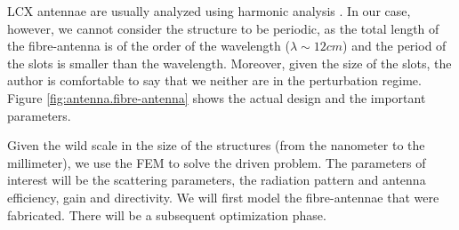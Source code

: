LCX antennae are usually analyzed using harmonic analysis \cite{WAN2001}. 
In our case, however, we cannot consider the structure to be periodic, as the total 
length of the fibre-antenna is of the order of the wavelength ($\lambda\sim12\unit{cm}$) and the period
of the slots is smaller than the wavelength. Moreover, given the size of the slots, 
the author is comfortable to say that we neither are in the perturbation regime. 
Figure \ref{fig:antenna.fibre-antenna} shows the actual design and the important parameters.

Given the wild scale in the size of the structures (from the nanometer to the millimeter), we use
the FEM to solve the driven problem. The parameters of interest will be the scattering parameters, the
radiation pattern and antenna efficiency, gain and directivity. We will first model the fibre-antennae
that were fabricated. There will be a subsequent optimization phase.


